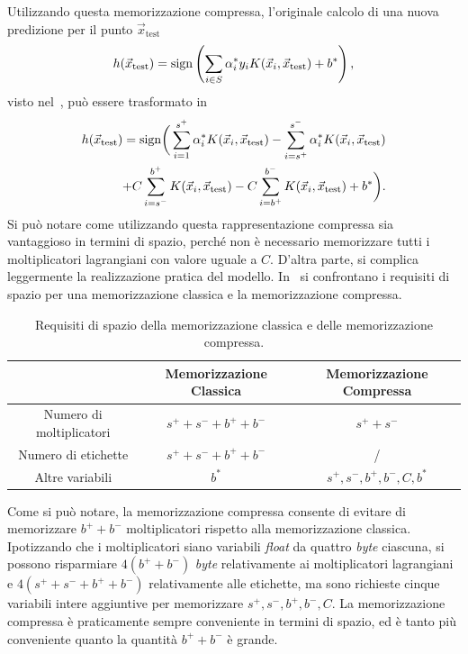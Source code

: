 Utilizzando questa memorizzazione compressa, l'originale calcolo di una nuova predizione per il punto $\Vec{x}_{\text{test}}$
\begin{equation*}
    h(\Vec{x}_{\text{test}}) = \mathrm{sign}\left(\sum_{i \in S}\alpha_i^*y_iK(\Vec{x}_i, \Vec{x}_\text{test}) + b^*\right),
\end{equation*}
visto nel~, può essere trasformato in
\begin{align*}
    h(\Vec{x}_{\text{test}}) = \mathrm{sign}\bigg(
            \sum_{i=1}^{s^+}\alpha_i^*K(\Vec{x}_i, \Vec{x}_\text{test}) 
            -\sum_{i=s^+}^{s^-}\alpha_i^*K(\Vec{x}_i, \Vec{x}_\text{test})\\
            +C\sum_{i=s^-}^{b^+}K(\Vec{x}_i, \Vec{x}_\text{test})
            -C\sum_{i=b^+}^{b^-}K(\Vec{x}_i, \Vec{x}_\text{test}) 
            + b^*
        \bigg).
\end{align*}
Si può notare come utilizzando questa rappresentazione compressa sia vantaggioso in termini di spazio, perché non è necessario memorizzare tutti i moltiplicatori lagrangiani con valore uguale a $C$.
D'altra parte, si complica leggermente la realizzazione pratica del modello.
In~ si confrontano i requisiti di spazio per una memorizzazione classica e la memorizzazione compressa.
\begin{table}
    \centering
    \begin{tabular}{c|c|c}
    \multicolumn{1}{c}{}    &  Memorizzazione Classica    & Memorizzazione Compressa \\     
    \toprule
    Numero di moltiplicatori    & $s^+ + s^- + b^+ + b^-$ & $s^+ +s^-$ \\
    \hline
    Numero di etichette         & $s^+ + s^- + b^+ + b^-$ &  / \\
    \hline
    Altre variabili             &         $b^*$          &  $s^+, s^-, b^+, b^-, C, b^*$ \\
    \bottomrule
    \end{tabular}
    \caption{Requisiti di spazio della memorizzazione classica e delle memorizzazione compressa.}
    \label{tab:compressione_spazio_risparmiato}
\end{table}
Come si può notare, la memorizzazione compressa consente di evitare di memorizzare $b^++b^-$ moltiplicatori rispetto alla memorizzazione classica.
Ipotizzando che i moltiplicatori siano variabili \emph{float} da quattro \emph{byte} ciascuna, si possono risparmiare $4(b^++b^-)$ \emph{byte} relativamente ai moltiplicatori lagrangiani e $4(s^+ + s^- + b^+ + b^-)$ relativamente alle etichette, ma sono richieste cinque variabili intere aggiuntive per memorizzare $s^+, s^-, b^+, b^-, C$.
La memorizzazione compressa è praticamente sempre conveniente in termini di spazio, ed è tanto più conveniente quanto la quantità $b^++b^-$ è grande.

